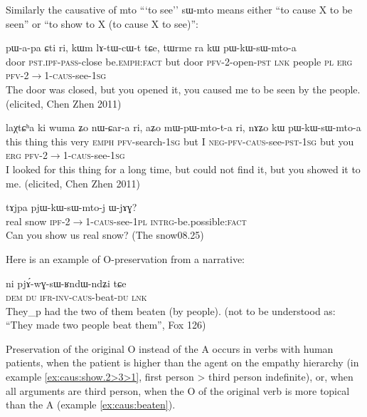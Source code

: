 \documentclass[oldfontcommands,oneside,a4paper,11pt]{article}
\newcommand{\ipa}[1]{{\phon \mbox{#1}}} %
\newcommand{\sg}{\textsc{sg}}
\newcommand{\pl}{\textsc{pl}}
\newcommand{\wav}[1]{}%
\newcommand{\pfv}{\textsc{pfv}}
\newcommand{\caus}{\textsc{caus}}
\newcommand{\lnk}{\textsc{lnk}}
\newcommand{\dem}{\textsc{dem}}
\newcommand{\du}{\textsc{du}}
\newcommand{\erg}{\textsc{erg}}
\newcommand{\emphat}{\textsc{emph}}
\newcommand{\evd}{\textsc{ifr}}
\newcommand{\intrg}{\textsc{intrg}}
\newcommand{\inv}{\textsc{inv}}
\newcommand{\ipf}{\textsc{ipf}}
\newcommand{\negat}{\textsc{neg}}
\newcommand{\fact}{\textsc{fact}}
\newcommand{\pass}{\textsc{pass}}
\newcommand{\pst}{\textsc{pst}}
\begin{document}
Similarly the causative of \ipa{mto} ```to see'' \ipa{sɯ-mto} means either ``to cause X to be seen'' or ``to show to X (to cause X to see)'':

\begin{exe} 
\ex \label{ex:caus:show.2>3>1}
\gll  \ipa{kɯm} 	\ipa{pɯ-a-pa} 	\ipa{ɕti} 	\ipa{ri,} 	\ipa{kɯm} 	\ipa{lɤ-tɯ-cɯ-t} 	\ipa{tɕe,} 	\ipa{tɯrme} 	\ipa{ra} 	\ipa{kɯ} 	\ipa{pɯ-kɯ-sɯ-mto-a}  \\
door \pst{}.\ipf{}-\pass{}-close be.\emphat{}:\fact{} but door \pfv{}-2-open-\pst{} \lnk{} people \pl{} \erg{}  \pfv{}-2$\rightarrow$1-\caus{}-see-1\sg{}  \\
 \glt The door was closed, but you opened it, you caused me to be seen by the people. (elicited, Chen Zhen 2011) \wav{8_pWkWsWmtoa} 
\end{exe} 


\begin{exe}
\ex
\gll \ipa{kɯki} 	\ipa{laχtɕʰa} 	\ipa{ki} 	\ipa{wuma} 	\ipa{ʑo} 	\ipa{nɯ-ɕar-a} 	\ipa{ri,} 	\ipa{aʑo} 	\ipa{mɯ-pɯ-mto-t-a} 	\ipa{ri,} 	\ipa{nɤʑo} 	\ipa{kɯ} 	\ipa{pɯ-kɯ-sɯ-mto-a}   \\
this thing this very \emphat{} \pfv{}-search-1\sg{} but I \negat{}-\pfv{}-\caus{}-see-\pst{}-1\sg{} but you \erg{}  \pfv{}-2$\rightarrow$1-\caus{}-see-1\sg{} \\
 \glt I looked for this thing for a long time, but could not find it, but you showed it to me. (elicited, Chen Zhen 2011)
\end{exe} 

\begin{exe}
\ex
\gll   \ipa{koŋla} 	\ipa{tɤjpa} 	\ipa{pjɯ-kɯ-sɯ-mto-j} 	\ipa{ɯ-jɤɣ?}   \\
real snow \ipf{}-2$\rightarrow$1-\caus{}-see-1\pl{} \intrg{}-be.possible:\fact{}  \\
 \glt Can you show us real snow? (The snow08.25)
\end{exe} 


Here is an example of O-preservation from a narrative:
\begin{exe} 
\ex \label{ex:caus:beaten}
\gll  \ipa{nɯnɯ} 	\ipa{ni} 	\ipa{pjɤ́-wɣ-sɯ-ʁndɯ-ndʑi} 	\ipa{tɕe}  \\
\dem{} \du{} \evd{}-\inv{}-\caus{}-beat-\du{} \lnk{} \\
\glt They_p had the two of them beaten (by people). (not to be understood as: ``They made two people beat them'', Fox 126)
\end{exe} 
Preservation of the original O   instead of the A occurs in verbs with  human patients, when the patient is higher than the agent on the empathy hierarchy (in example \ref{ex:caus:show.2>3>1}, first person > third person indefinite), or, when all arguments are third person, when the O of the original verb is more topical than the A (example \ref{ex:caus:beaten}).
\end{document}

